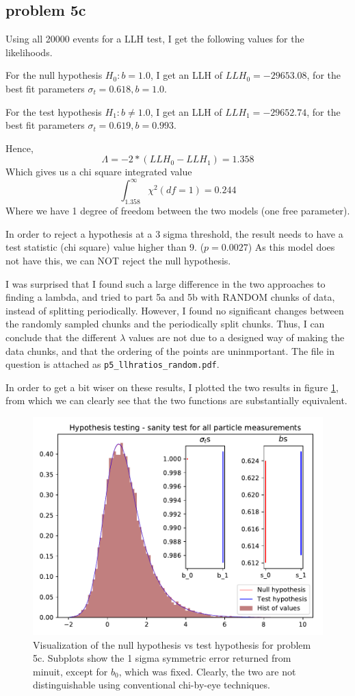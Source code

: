 \documentclass[a4paper,11pt]{article}
\begin{document}
\subsection{problem 5c }
Using all 20000 events for a LLH test, I get the following values for the likelihoods.

For the null hypothesis \( H_0 : b = 1.0 \), I get an LLH of \(LLH_0 = -29653.08\), for the best fit parameters \(\sigma_t = 0.618, b = 1.0  \).

For the test hypothesis \( H_1 : b \neq 1.0 \), I get an LLH of \(LLH_1 = -29652.74\), for the best fit parameters \(\sigma_t = 0.619, b = 0.993 \).

Hence,
\[
\Lambda = -2 * ( LLH_0 - LLH_1 ) = 1.358
\]
Which gives us a chi square integrated value \[\int_{1.358}^{\infty}\chi^2(df= 1) = 0.244\]
Where we have 1 degree of freedom between the two models (one free parameter).

In order to reject a hypothesis at a 3 sigma threshold, the result needs to have a test statistic (chi square) value higher than 9. ($p = 0.0027$)
As this model does not have this, we can NOT reject the null hypothesis.

I was surprised that I found such a large difference in the two approaches to finding a lambda, and tried to part 5a and 5b with RANDOM chunks of data, instead of splitting periodically.
However, I found no significant changes between the randomly sampled chunks and the periodically split chunks.
Thus, I can conclude that the different $\lambda$ values are not due to a designed way of making the data chunks, and that the ordering of the points are uninmportant.
The file in question is attached as \verb|p5_llhratios_random.pdf|.

In order to get a bit wiser on these results, I plotted the two results in figure \ref{p5_sanit}, from which we can clearly see that the two functions are substantially equivalent.
\begin{figure}
  \includegraphics[width=\linewidth]{../p5c_sanity}
  \caption{Visualization of the null hypothesis vs test hypothesis for problem 5c. Subplots show the 1 sigma symmetric error returned from minuit, except for $b_0$, which was fixed.
  Clearly, the two are not distinguishable using conventional chi-by-eye techniques. }
  \label{p5_sanit}
\end{figure}
\end{document}

